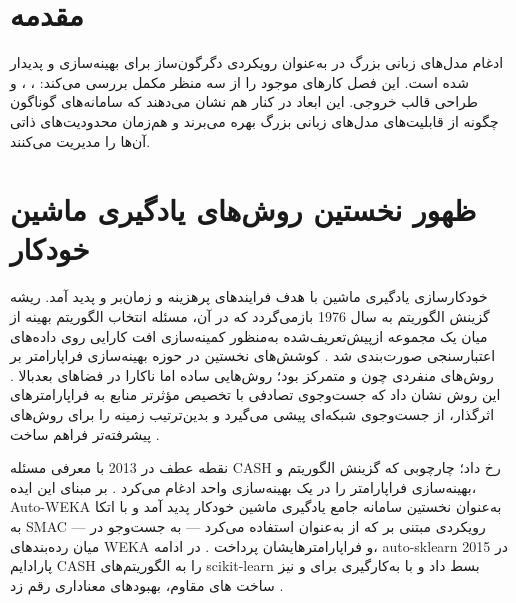 \section{مقدمه}
ادغام مدل‌های زبانی بزرگ در  به‌عنوان رویکردی دگرگون‌ساز برای بهینه‌سازی  و  پدیدار شده است. این فصل کارهای موجود را از سه منظر مکمل بررسی می‌کند: ، ، و طراحی قالب خروجی. این ابعاد در کنار هم نشان می‌دهند که سامانه‌های گوناگون چگونه از قابلیت‌های مدل‌های زبانی بزرگ بهره می‌برند و هم‌زمان محدودیت‌های ذاتی آن‌ها را مدیریت می‌کنند.

\section{ظهور نخستین روش‌های یادگیری ماشین خودکار}
خودکارسازی یادگیری ماشین با هدف  فرایندهای پرهزینه و زمان‌بر  و  پدید آمد. ریشه گزینش الگوریتم به سال 1976 بازمی‌گردد که در آن، مسئله انتخاب الگوریتم بهینه از میان یک مجموعه ازپیش‌تعریف‌شده به‌منظور کمینه‌سازی افت کارایی روی داده‌های اعتبارسنجی صورت‌بندی شد \cite{RICE197665}. کوشش‌های نخستین در حوزه بهینه‌سازی فراپارامتر بر روش‌های منفردی چون  و  متمرکز بود؛ روش‌هایی ساده اما ناکارا در فضاهای بعدبالا \cite{JMLR:v13:bergstra12a}. این روش نشان داد که جست‌وجوی تصادفی با تخصیص مؤثرتر منابع به فراپارامترهای اثرگذار، از جست‌وجوی شبکه‌ای پیشی می‌گیرد و بدین‌ترتیب زمینه را برای روش‌های پیشرفته‌تر فراهم ساخت \cite{JMLR:v13:bergstra12a}.

نقطه عطف در 2013 با معرفی مسئله CASH رخ داد؛ چارچوبی که گزینش الگوریتم و بهینه‌سازی فراپارامتر را در یک بهینه‌سازی واحد ادغام می‌کرد \cite{10.1145/2487575.2487629}. بر مبنای این ایده، Auto-WEKA به‌عنوان نخستین سامانه جامع یادگیری ماشین خودکار پدید آمد و با اتکا به SMAC — رویکردی مبتنی بر  که از  به‌عنوان  استفاده می‌کرد — به جست‌وجو در میان رده‌بندهای WEKA و فراپارامترهایشان پرداخت \cite{10.1145/2487575.2487629, 10.1007/978-3-642-25566-3_40}. در ادامه، auto-sklearn در 2015 پارادایم CASH را به الگوریتم‌های scikit-learn بسط داد و با به‌کارگیری  برای  و نیز ساخت ‌های مقاوم، بهبودهای معناداری رقم زد \cite{NIPS2015_11d0e628}.

